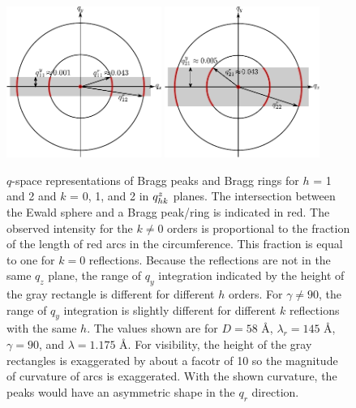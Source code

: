 \begin{figure}[htbp]
  \centering
  \includegraphics[width=0.45\textwidth]{figures/ripple/analysis/ewald_side_h1_ver1}
  \includegraphics[width=0.45\textwidth]{figures/ripple/analysis/ewald_side_h2_ver1}
  \caption{$q$-space representations of Bragg peaks and Bragg rings 
  for $h$ = 1 and 2 and $k$ = 0, 1, and 2 in $q_{hk}^z$ planes.
  The intersection between the Ewald sphere and 
  a Bragg peak/ring is indicated in red. 
  The observed intensity for the $k\neq 0$ orders is proportional to
  the fraction of the length of red arcs in the circumference. This 
  fraction is equal to one for $k=0$ reflections.
  Because the reflections are not in the same $q_z$ plane, the range of $q_y$ 
  integration indicated by the height of the gray rectangle is different for different
  $h$ orders. For $\gamma\neq 90$\textdegree, the range of $q_y$ integration is
  slightly different for different $k$ reflections with the same $h$. 
  The values shown are for $D=58$ \AA, $\lambda_r=145$ \AA, $\gamma=90$\textdegree,
  and $\lambda=1.175$ \AA. For visibility, the height of the gray rectangles 
  is exaggerated by about a facotr of 10 so the magnitude of curvature of arcs 
  is exaggerated.  With the shown curvature, the peaks would have an asymmetric 
  shape in the $q_r$ direction.}
  \label{fig:ewald_side}
\end{figure}

